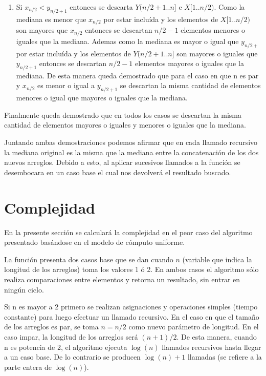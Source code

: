 \documentclass[a4paper,11pt] {article}
\begin{document}
\begin{enumerate}
\begin{enumerate}
\item
Si $x_{n/2} < y_{n/2+1}$ entonces se descarta $Y(n/2+1..n]$ e $X[1..n/2)$. Como la mediana es menor que $x_{n/2}$ por estar inclu\'ida y los elementos de $X[1..n/2)$ son mayores que $x_{n/2}$ entonces se descartan $n/2-1$ elementos menores o iguales que la mediana. Ademas como la mediana es mayor o igual que $y_{n/2+}$ por estar inclu\'ida y los elementos de $Y(n/2+1..n]$ son mayores o iguales que $y_{n/2+1}$ entonces se descartan $n/2-1$ elementos mayores o iguales que la mediana. De esta manera queda demostrado que para el caso en que n es par y $x_{n/2}$ es menor o igual a $y_{n/2+1}$ se descartan la misma cantidad de elementos menores o igual que mayores o iguales que la mediana.
\end{enumerate}

\end{enumerate}

Finalmente queda demostrado que en todos los casos se descartan la misma cantidad de elementos mayores o iguales y menores o iguales que la mediana.

Juntando ambas demostraciones podemos afirmar que en cada llamado recursivo la mediana original es la misma que la mediana entre la concatenaci\'on de los dos nuevos arreglos. Debido a esto, al aplicar sucesivos llamados a la funci\'on se desembocara en un caso base el cual nos devolver\'a el resultado buscado.

\section*{Complejidad}
 
En la presente secci\'on se calcular\'a la complejidad en el peor caso del algoritmo presentado bas\'andose en el modelo de c\'omputo uniforme.

La funci\'on presenta dos casos base que se dan cuando $n$ (variable que indica la longitud de los arreglos) toma los valores 1 \'o 2. En ambos casos el algoritmo s\'olo realiza comparaciones entre elementos y retorna un resultado, sin entrar en ning\'un ciclo.

Si n es mayor a 2 primero se realizan asignaciones y operaciones simples (tiempo constante) para luego efectuar un llamado recursivo. En el caso en que el tama\~{n}o de los arreglos es par, se toma $n=n/2$ como nuevo par\'ametro de longitud. En el caso impar, la longitud de los arreglos ser\'a $(n+1)/2$. De esta manera, cuando n es potencia de 2, el algoritmo ejecuta $\log(n)$ llamados recursivos hasta llegar a un caso base. De lo contrario se producen $\log(n)+1$ llamadas (se refiere a la parte entera de $\log(n)$).
\end{document}
